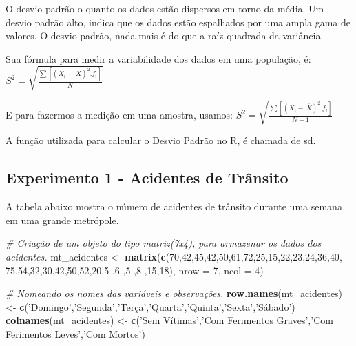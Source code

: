 \documentclass[portuguese,]{article}
\newenvironment{Shaded}{\begin{snugshade}}{\end{snugshade}}
\newcommand{\KeywordTok}[1]{\textcolor[rgb]{0.13,0.29,0.53}{\textbf{#1}}}
\newcommand{\DataTypeTok}[1]{\textcolor[rgb]{0.13,0.29,0.53}{#1}}
\newcommand{\DecValTok}[1]{\textcolor[rgb]{0.00,0.00,0.81}{#1}}
\newcommand{\StringTok}[1]{\textcolor[rgb]{0.31,0.60,0.02}{#1}}
\newcommand{\CommentTok}[1]{\textcolor[rgb]{0.56,0.35,0.01}{\textit{#1}}}
\newcommand{\NormalTok}[1]{#1}
\begin{document}
O desvio padrão o quanto os dados estão dispersos em torno da média. Um
desvio padrão alto, indica que os dados estão espalhados por uma ampla
gama de valores. O desvio padrão, nada mais é do que a raíz quadrada da
variância.

Sua fórmula para medir a variabilidade dos dados em uma população, é:
\(S^2=\sqrt{\frac{\sum[(X_i-\ \overline{X})^2.f_i]}{N}}\)

E para fazermos a medição em uma amostra, usamos:
\(S^2=\sqrt{\frac{\sum[(X_i-\ \overline{X})^2.f_i]}{N-1}}\)

A função utilizada para calcular o Desvio Padrão no R, é chamada de
\href{https://www.rdocumentation.org/packages/stats/versions/3.5.2/topics/sd}{sd}.

\subsection{Experimento 1 - Acidentes de
Trânsito}\label{experimento-1---acidentes-de-transito}

A tabela abaixo mostra o número de acidentes de trânsito durante uma
semana em uma grande metrópole.

\begin{Shaded}
\begin{Highlighting}[]
\CommentTok{# Criação de um objeto do tipo matriz(7x4), para armazenar os dados dos acidentes.}
\NormalTok{mt_acidentes <-}\StringTok{ }\KeywordTok{matrix}\NormalTok{(}\KeywordTok{c}\NormalTok{(}\DecValTok{70}\NormalTok{,}\DecValTok{42}\NormalTok{,}\DecValTok{45}\NormalTok{,}\DecValTok{42}\NormalTok{,}\DecValTok{50}\NormalTok{,}\DecValTok{61}\NormalTok{,}\DecValTok{72}\NormalTok{,}\DecValTok{25}\NormalTok{,}\DecValTok{15}\NormalTok{,}\DecValTok{22}\NormalTok{,}\DecValTok{23}\NormalTok{,}\DecValTok{24}\NormalTok{,}\DecValTok{36}\NormalTok{,}\DecValTok{40}\NormalTok{,}
                         \DecValTok{75}\NormalTok{,}\DecValTok{54}\NormalTok{,}\DecValTok{32}\NormalTok{,}\DecValTok{30}\NormalTok{,}\DecValTok{42}\NormalTok{,}\DecValTok{50}\NormalTok{,}\DecValTok{52}\NormalTok{,}\DecValTok{20}\NormalTok{,}\DecValTok{5}\NormalTok{ ,}\DecValTok{6}\NormalTok{ ,}\DecValTok{5}\NormalTok{ ,}\DecValTok{8}\NormalTok{ ,}\DecValTok{15}\NormalTok{,}\DecValTok{18}\NormalTok{),}
                       \DataTypeTok{nrow =} \DecValTok{7}\NormalTok{,}
                       \DataTypeTok{ncol =} \DecValTok{4}\NormalTok{)}

\CommentTok{# Nomeando os nomes das variáveis e observações. }
\KeywordTok{row.names}\NormalTok{(mt_acidentes) <-}\StringTok{ }\KeywordTok{c}\NormalTok{(}\StringTok{'Domingo'}\NormalTok{,}\StringTok{'Segunda'}\NormalTok{,}\StringTok{'Terça'}\NormalTok{,}\StringTok{'Quarta'}\NormalTok{,}\StringTok{'Quinta'}\NormalTok{,}\StringTok{'Sexta'}\NormalTok{,}\StringTok{'Sábado'}\NormalTok{)}
\KeywordTok{colnames}\NormalTok{(mt_acidentes) <-}\StringTok{ }\KeywordTok{c}\NormalTok{(}\StringTok{'Sem Vítimas'}\NormalTok{,}\StringTok{'Com Ferimentos Graves'}\NormalTok{,}\StringTok{'Com Ferimentos Leves'}\NormalTok{,}\StringTok{'Com Mortos'}\NormalTok{)}
\end{Highlighting}
\end{Shaded}
\end{document}
